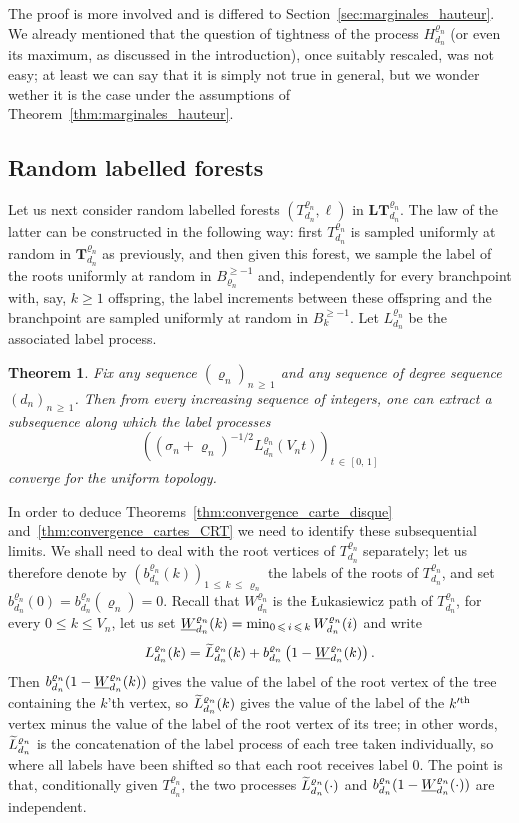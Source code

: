 \documentclass[10pt]{amsart}
\newtheorem{theo}{Theorem}[section]
\theoremstyle{definition}\newtheorem{defi}[theo]{Definition}\newtheorem{rema}[theo]{Remark}\newtheorem{exam}[theo]{Example}\newtheorem{exem}[theo]{Example}\newtheorem{nota}[theo]{Notation}
\newcommand{\1}{\ensembles{1}}
\newcommand{\tildep}[1]{\widetilde{#1}\vphantom{#1}}
\newcommand{\underlinep}[1]{\underline{#1}\vphantom{#1}}
\newcommand{\Tree}{\mathbf{T}}
\newcommand{\LTree}{\mathbf{LT}}
\renewcommand{\le}{\leqslant}
\renewcommand{\ge}{\geqslant}
\newcommand{\BBmap}{B}
\newcommand{\Fn}{\Tree_{d_n}^{\varrho_n}}
\newcommand{\fn}{T_{d_n}^{\varrho_n}}
\newcommand{\LFn}{\LTree_{d_n}^{\varrho_n}}
\newcommand{\Wfn}{W_{d_n}^{\varrho_n}}
\newcommand{\Hfn}{H_{d_n}^{\varrho_n}}
\newcommand{\Lfn}{L_{d_n}^{\varrho_n}}
\newcommand{\tLfn}{\tildep{L}_{d_n}^{\varrho_n}}
\newcommand{\bfn}{b_{d_n}^{\varrho_n}}
\newcommand{\infWfn}{\underlinep{W}_{d_n}^{\varrho_n}}
\newcommand{\vertices}{V}
\providecommand{\?}{}
\begin{document}
The proof is more involved and is differed to Section~\ref{sec:marginales_hauteur}. We already mentioned that the question of tightness of the process $\Hfn$ (or even its maximum, as discussed in the introduction), once suitably rescaled, was not easy; at least we can say that it is simply not true in general, but we wonder wether it is the case under the assumptions of Theorem~\ref{thm:marginales_hauteur}.



\subsection{Random labelled forests}\label{sec:enonce_tension_convergence_etiquettes}

Let us next consider random labelled forests $(\fn, \ell)$ in $\LFn$. The law of the latter can be constructed in the following way: first $\fn$ is sampled uniformly at random in $\Fn$ as previously, and then given this forest, we sample the label of the roots uniformly at random in $\BBmap_{\varrho_n}^{\ge -1}$ and, independently for every branchpoint with, say, $k \ge 1$ offspring, the label increments between these offspring and the branchpoint are sampled uniformly at random in $\BBmap_k^{\ge -1}$. Let $\Lfn$ be the associated label process.


\begin{theo}\label{thm:tension_etiquettes}
Fix any sequence $(\varrho_n)_{n\,\ge\,1}$ and any sequence of degree sequence $(d_n)_{n\,\ge\,1}$. Then from every increasing sequence of integers, one can extract a subsequence along which the label processes
\[
\left(\left(\sigma_n + \varrho_n\right)^{-1/2} \Lfn(\vertices_n t)\right)_{t \,\in\,[0,\,1]}
\]
converge for the uniform topology.
\end{theo}



In order to deduce Theorems~\ref{thm:convergence_carte_disque} and~\ref{thm:convergence_cartes_CRT} we need to identify these subsequential limits. We shall need to deal with the root vertices of $\fn$ separately; let us therefore denote by $(\bfn(k))_{1\,\le\,k\,\le\,\varrho_n}$ the labels of the roots of $\fn$, and set $\bfn(0) = \bfn(\varrho_n) = 0$. Recall that $\Wfn$ is the {\L}ukasiewicz path of $\fn$, for every $0 \le k \le \vertices_n$, let us set $\infWfn(k) = \min_{0\,\le\,i\,\le\,k} \Wfn(i)$ and write
\begin{equation}\label{eq:decomposition_labels}
\Lfn(k) = \tLfn(k) + \bfn\left(1-\infWfn(k)\right).
\end{equation}
Then $\bfn(1-\infWfn(k))$ gives the value of the label of the root vertex of the tree containing the $k$'th vertex, so $\tLfn(k)$ gives the value of the label of the $k'^{\rm th}$ vertex minus the value of the label of the root vertex of its tree; in other words, $\tLfn$ is the concatenation of the label process of each tree taken individually, so where all labels have been shifted so that each root receives label $0$. The point is that, conditionally given $\fn$, the two processes $\tLfn(\cdot)$ and $\bfn(1-\infWfn(\cdot))$ are independent.
\end{document}
